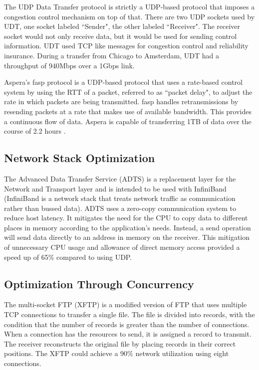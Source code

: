 The UDP Data Transfer protocol \cite{gu2007udt} is strictly a UDP-based protocol that imposes a congestion control mechanism on top of that. There are two UDP sockets used by UDT, one socket labeled ``Sender", the other labeled ``Receiver". The receiver socket would not only receive data, but it would be used for sending control information. UDT used TCP like messages for congestion control and reliability insurance. During a transfer from Chicago to Amsterdam, UDT had a throughput of 940Mbps over a 1Gbps link.

Aspera's fasp protocol \cite{Fan2010}\cite{Aspera2016} is a UDP-based protocol that uses a rate-based control system by using the RTT of a packet, referred to as ``packet delay", to adjust the rate in which packets are being transmitted. fasp handles retransmissions by resending packets at a rate that makes use of available bandwidth. This provides a continuous flow of data. Aspera is capable of transferring 1TB of data over the course of 2.2 hours \cite{Fan2010}.

\subsection{Network Stack Optimization}

The Advanced Data Transfer Service (ADTS) \cite{lai2009designing} is a replacement layer for the Network and Transport layer and is intended to be used with InfiniBand \cite{Pfister2001} (InfiniBand is a network stack that treats network traffic as communication rather than bussed data). ADTS uses a zero-copy communication system to reduce host latency. It mitigates the need for the CPU to copy data to different places in memory according to the application's needs. Instead, a send operation will send data directly to an address in memory on the receiver. This mitigation of unnecessary CPU usage and allowance of direct memory access provided a speed up of 65\% compared to using UDP.

\subsection{Optimization Through Concurrency}

The multi-socket FTP (XFTP) \cite{Allman1995}\cite{Allman1997} is a modified version of FTP \cite{postel1980user} that uses multiple TCP connections to transfer a single file. The file is divided into records, with the condition that the number of records is greater than the number of connections. When a connection has the resources to send, it is assigned a record to transmit. The receiver reconstructs the original file by placing records in their correct positions. The XFTP could achieve a 90\% network utilization using eight connections.

